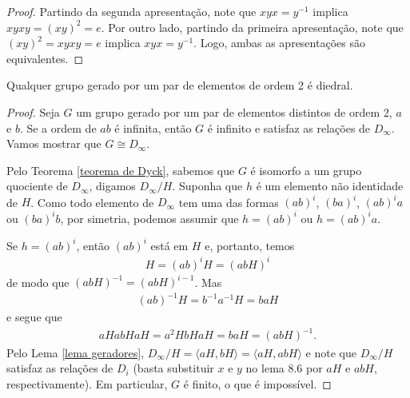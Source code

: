 	\begin{proof}
		Partindo da segunda apresentação, note que $xyx=y^{-1}$ implica $xyxy=(xy)^2=e$. Por outro lado, 
		partindo da primeira apresentação, note que $(xy)^2=xyxy=e$ implica $xyx=y^{-1}$. Logo, 
		ambas as apresentações são equivalentes.
	\end{proof}
	\begin{theorem}
	\label{teo-class-grupos-diedrais}
		Qualquer grupo gerado por um par de elementos de ordem 2 é diedral. 
	\end{theorem}
	\begin{proof}
		Seja $G$ um grupo gerado por um par de elementos distintos de ordem 2, $a$ e $b$. 
		Se a ordem de $ab$ é infinita, então $G$ é infinito e satisfaz as relações de $D_{\infty}$. 
		Vamos mostrar que $G\cong D_{\infty}$. 
		
		\par\vspace{0.3cm} Pelo Teorema \ref{teorema de Dyck}, sabemos que $G$ é isomorfo a um 
		grupo quociente de $D_{\infty}$, digamos $D_{\infty}/H$. Suponha que $h$ é um elemento não 
		identidade de $H$. Como todo elemento de $D_{\infty}$ tem uma das formas 
		$(ab)^i$, $(ba)^i$, $(ab)^ia$ ou $(ba)^ib$, por simetria, podemos assumir que 
		$h = (ab)^i$ ou $h = (ab)^ia$.
		
		\par\vspace{0.3cm} Se $h = (ab)^i$, então $(ab)^i$ está em $H$ e, portanto, temos
		\begin{align*}
		    H = (ab)^iH = (abH)^i
		\end{align*}
		de modo que $(abH)^{-1} = (abH)^{i-1}$. Mas
		\begin{align*}
		    (ab)^{-1}H = b^{-1}a^{-1}H = baH
		\end{align*}
		e segue que
		\begin{align*}
		    aHabHaH = a^2HbHaH = baH = (abH)^{-1}.
		\end{align*}
		Pelo Lema \ref{lema geradores}, $D_{\infty}/H = \langle aH, bH \rangle 
		= \langle aH, abH \rangle$ e note que $D_{\infty}/H$ satisfaz as relações de $D_i$ 
		(basta substituir $x$ e $y$ no lema 8.6 por $aH$ e $abH$, respectivamente). Em particular, 
		$G$ é finito, o que é impossível.
		

\end{proof}

